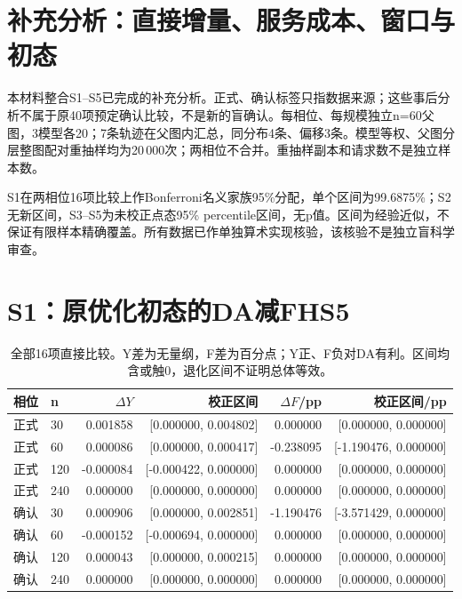 \documentclass[UTF8,a4paper,twocolumn,fontset=none,zihao=5]{ctexart}
\begin{document}
\onecolumn{}

\section*{补充分析：直接增量、服务成本、窗口与初态}

本材料整合S1–S5已完成的补充分析。正式、确认标签只指数据来源；这些事后分析不属于原40项预定确认比较，不是新的盲确认。每相位、每规模独立n=60父图，3模型各20；7条轨迹在父图内汇总，同分布4条、偏移3条。模型等权、父图分层整图配对重抽样均为20\,000次；两相位不合并。重抽样副本和请求数不是独立样本数。

S1在两相位16项比较上作Bonferroni名义家族95\%分配，单个区间为99.6875\%；S2无新区间，S3–S5为未校正点态95\% percentile区间，无p值。区间为经验近似，不保证有限样本精确覆盖。所有数据已作单独算术实现核验，该核验不是独立盲科学审查。

\section*{S1：原优化初态的DA减FHS5}

\begin{table}[ht]\centering\caption{全部16项直接比较。Y差为无量纲，F差为百分点；Y正、F负对DA有利。区间均含或触0，退化区间不证明总体等效。}\small\begin{tabular}{llrrrr}\toprule 相位 & n & $\Delta Y$ & 校正区间 & $\Delta F$/pp & 校正区间/pp\\\midrule

正式 & 30 & 0.001858 & [0.000000, 0.004802] & 0.000000 & [0.000000, 0.000000] \\

正式 & 60 & 0.000086 & [0.000000, 0.000417] & -0.238095 & [-1.190476, 0.000000] \\

正式 & 120 & -0.000084 & [-0.000422, 0.000000] & 0.000000 & [0.000000, 0.000000] \\

正式 & 240 & 0.000000 & [0.000000, 0.000000] & 0.000000 & [0.000000, 0.000000] \\

确认 & 30 & 0.000906 & [0.000000, 0.002851] & -1.190476 & [-3.571429, 0.000000] \\

确认 & 60 & -0.000152 & [-0.000694, 0.000000] & 0.000000 & [0.000000, 0.000000] \\

确认 & 120 & 0.000043 & [0.000000, 0.000215] & 0.000000 & [0.000000, 0.000000] \\

确认 & 240 & 0.000000 & [0.000000, 0.000000] & 0.000000 & [0.000000, 0.000000] \\

\bottomrule\end{tabular}\end{table}
\end{document}
